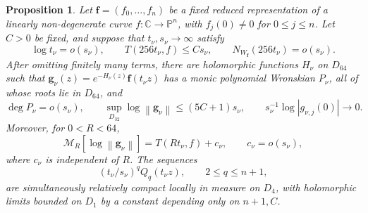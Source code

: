 \documentclass[11pt,letterpaper,reqno]{amsart}
\newtheorem{prop}[thm]{Proposition}
\theoremstyle{remark}
\numberwithin{equation}{section}
\newcommand{\C}{\mathbb C}
\newcommand{\PP}{\mathbb P}
\newcommand{\mean}[2]{\mathcal M_{#1}\!\left[#2\right]}
\newcommand{\norm}[1]{\left\lVert#1\right\rVert}
\newcommand{\fv}{\bm f}
\newcommand{\gv}{\bm g}
\begin{document}
\begin{prop}\label{prop:representation}
Let $\fv=(f_0,\ldots,f_n)$ be a fixed reduced representation of a
linearly non-degenerate curve $f\colon\C\to\PP^n$, with
$f_j(0)\ne0$ for $0\leq j\leq n$.
Let $C>0$ be fixed, and suppose that $t_\nu,s_\nu\to\infty$ satisfy
\begin{equation}\label{eq:scalehyp}
 \log t_\nu=o(s_\nu),\qquad T(256t_\nu,f)\le Cs_\nu,
 \qquad N_{W_{\fv}}(256t_\nu)=o(s_\nu).
\end{equation}
After omitting finitely many terms, there are holomorphic functions
$H_\nu$ on $D_{64}$ such that
$\gv_\nu(z)=e^{-H_\nu(z)}\fv(t_\nu z)$ has a monic polynomial Wronskian
$P_\nu$, all of whose roots lie in $D_{64}$, and
\begin{equation}\label{eq:representationbounds}
 \deg P_\nu=o(s_\nu),\qquad
 \sup_{D_{32}}\log\norm{\gv_\nu}\le(5C+1)s_\nu,\qquad
 s_\nu^{-1}\log|g_{\nu,j}(0)|\longrightarrow0.
\end{equation}
Moreover, for $0<R<64$,
\begin{equation}\label{eq:meanidentity}
 \mean R{\log\norm{\gv_\nu}}=T(Rt_\nu,f)+c_\nu,
 \qquad c_\nu=o(s_\nu),
\end{equation}
where $c_\nu$ is independent of $R$. The sequences
\begin{equation}\label{eq:scaledcompact}
 (t_\nu/s_\nu)^qQ_q(t_\nu z),\qquad 2\le q\le n+1,
\end{equation}
are simultaneously relatively compact locally in measure on $D_4$, with
holomorphic limits bounded on $D_1$ by a constant depending only on $n+1,C$.
\end{prop}
\end{document}
